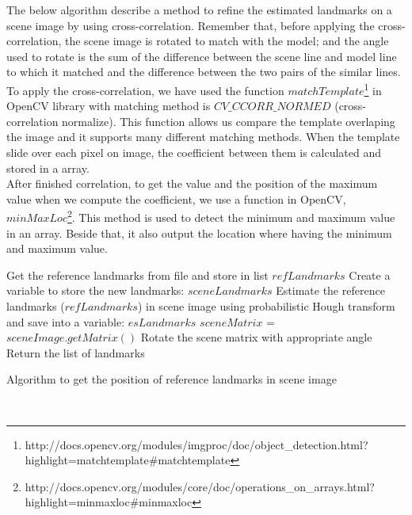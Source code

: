 The below algorithm describe a method to refine the estimated landmarks on a scene image by using cross-correlation. Remember that, before applying the cross-correlation, the scene image is rotated to match with the model; and the angle used to rotate is the sum of the difference between the scene line and model line to which it matched and the difference between the two pairs of the similar lines.\\
To apply the cross-correlation, we have used the function \textbf{$matchTemplate$}\footnote{http://docs.opencv.org/modules/imgproc/doc/object\_detection.html?highlight=matchtemplate\#matchtemplate} in OpenCV library with matching method is $CV\_CCORR\_NORMED$ (cross-correlation normalize). This function allows us compare the template overlaping the image and it supports many different matching methods. When the template slide over each pixel on image, the coefficient between them is calculated and stored in a array.\\[0.2cm]
After finished correlation, to get the value and the position of the maximum value when we compute the coefficient, we use a function in OpenCV,  \textbf{$minMaxLoc$}\footnote{http://docs.opencv.org/modules/core/doc/operations\_on\_arrays.html?highlight=minmaxloc\#minmaxloc}. This method is used to detect the minimum and maximum value in an array. Beside that, it also output the location where having the minimum and maximum value.\\[0.2cm]
\begin{algorithm}[H]
\Indm 
{}
\SetAlgoLined
{}
\Indp
Get the reference landmarks from file and store in list $refLandmarks$\;
Create a variable to store the new landmarks: $sceneLandmarks$\;
Estimate the reference landmarks ($refLandmarks$) in scene image using probabilistic Hough transform and save into a variable: $esLandmarks$\;
$sceneMatrix$ = $sceneImage.getMatrix()$\;
Rotate the scene matrix with appropriate angle\;
Return the list of landmarks\;
\caption{Algorithm to get the position of reference landmarks in scene image}
\label{alccross}
\end{algorithm}~\\[0.2cm]